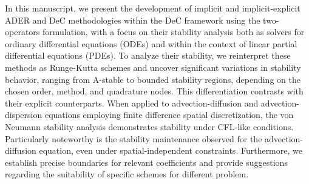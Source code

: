 In this manuscript, we present the development of implicit and implicit-explicit ADER and DeC methodologies within the DeC framework using the two-operators formulation, with a focus on their stability analysis both as solvers for ordinary differential equations (ODEs) and within the context of linear partial differential equations (PDEs).
To analyze their stability, we reinterpret these methods as Runge-Kutta schemes and uncover significant variations in stability behavior, ranging from A-stable to bounded stability regions, depending on the chosen order, method, and quadrature nodes. 
This differentiation contrasts with their explicit counterparts.
When applied to advection-diffusion and advection-dispersion equations employing finite difference spatial discretization, the von Neumann stability analysis demonstrates stability under CFL-like conditions. 
Particularly noteworthy is the stability maintenance observed for the advection-diffusion equation, even under spatial-independent constraints.
Furthermore, we establish precise boundaries for relevant coefficients and provide suggestions regarding the suitability of specific schemes for different problem.





